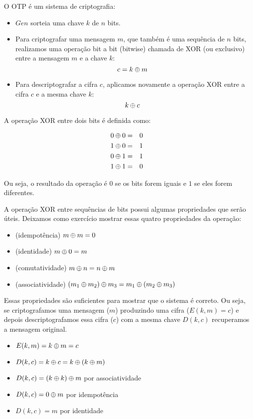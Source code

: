 O OTP é um sistema de criptografia:
\begin{itemize}
\item $Gen$ sorteia uma chave $k$ de $n$ bits.
\item Para criptografar uma mensagem $m$, que também é uma sequência de $n$ bits, realizamos uma operação bit a bit (bitwise) chamada de XOR (ou exclusivo) entre a mensagem $m$ e a chave $k$:
  \begin{displaymath}
    c = k \oplus m
  \end{displaymath}
\item Para descriptografar a cifra $c$, aplicamos novamente a operação XOR entre a cifra $c$ e a mesma chave $k$:
  \begin{displaymath}
    k \oplus c
  \end{displaymath}
\end{itemize}

A operação XOR entre dois bits é definida como:

\begin{eqnarray*}
  0 \oplus 0 & = & 0\\
  1 \oplus 0 & = & 1\\
  0 \oplus 1 & = & 1\\
  1 \oplus 1 & = & 0
\end{eqnarray*}

Ou seja, o resultado da operação é $0$ se os bits forem iguais e $1$ se eles forem diferentes.

A operação XOR entre sequências de bits possui algumas propriedades que serão úteis.
Deixamos como exercício mostrar essas quatro propriedades da operação:

\begin{itemize}
\item (idempotência) $m \oplus m = 0$
\item (identidade) $m \oplus 0 = m$
\item (comutatividade) $m \oplus n = n \oplus m$
\item (associatividade) $(m_1 \oplus m_2) \oplus m_3 = m_1 \oplus (m_2 \oplus m_3)$
\end{itemize}

Essas propriedades são suficientes para mostrar que o sistema é correto.
Ou seja, se criptografamos uma mensagem ($m$) produzindo uma cifra ($E(k,m) = c$) e depois descriptografamos essa cifra ($c$) com a mesma chave $D(k,c)$ recuperamos a mensagem original.

\begin{itemize}
\item[] $E(k,m) = k \oplus m = c$
\item[] $D(k,c) = k \oplus c = k \oplus (k \oplus m)$
\item[] $D(k,c) = (k \oplus k) \oplus m$ por associatividade
\item[] $D(k,c) = 0 \oplus m$ por idempotência
\item[] $D(k,c) = m$ por identidade
\end{itemize}

